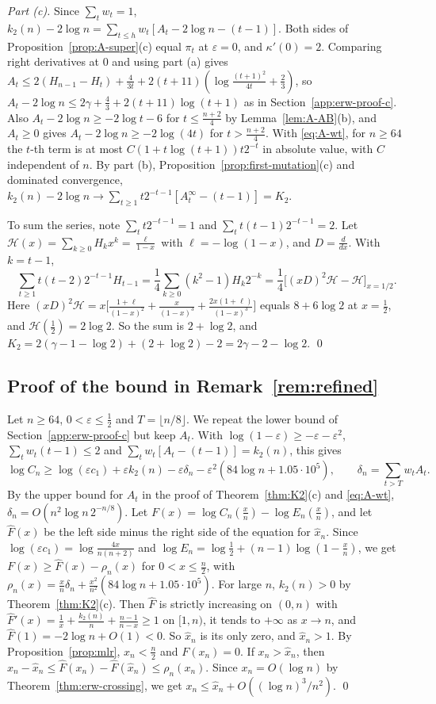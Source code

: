 \emph{Part (c).} Since $\sum_tw_t=1$,
$k_2(n)-2\log n=\sum_{t\le h}w_t[A_t-2\log n-(t-1)]$. Both sides of
Proposition~\ref{prop:A-super}(c) equal $\pi_t$ at $\varepsilon=0$, and
$\kappa'(0)=2$. Comparing right derivatives at 0 and using part (a) gives
$A_t\le2(H_{n-1}-H_t)+\frac4{3t}+2(t+11)(\log\frac{(t+1)^2}{4t}+\frac23)$,
so $A_t-2\log n\le2\gamma+\frac43+2(t+11)\log(t+1)$ as in
Section~\ref{app:erw-proof-c}. Also $A_t-2\log n\ge-2\log t-6$ for
$t\le\frac{n+2}4$ by Lemma~\ref{lem:A-AB}(b), and $A_t\ge0$ gives
$A_t-2\log n\ge-2\log(4t)$ for $t>\frac{n+2}4$. With \eqref{eq:A-wt}, for
$n\ge64$ the $t$-th term is at most $C(1+t\log(t+1))t2^{-t}$ in absolute
value, with $C$ independent of $n$. By part (b),
Proposition~\ref{prop:first-mutation}(c) and dominated convergence,
$k_2(n)-2\log n\to\sum_{t\ge1}t2^{-t-1}[A^\infty_t-(t-1)]=K_2$.

To sum the series, note $\sum_tt2^{-t-1}=1$ and $\sum_tt(t-1)2^{-t-1}=2$.
Let $\mathcal H(x)=\sum_{k\ge0}H_kx^k=\frac{\ell}{1-x}$ with
$\ell=-\log(1-x)$, and $D=\frac d{dx}$. With $k=t-1$,
\[
 \sum_{t\ge1}t(t-2)2^{-t-1}H_{t-1}=\frac14\sum_{k\ge0}(k^2-1)H_k2^{-k}
 =\frac14\bigl[(xD)^2\mathcal H-\mathcal H\bigr]_{x=1/2}.
\]
Here $(xD)^2\mathcal H=x\bigl[\frac{1+\ell}{(1-x)^2}+\frac{x}{(1-x)^3}
+\frac{2x(1+\ell)}{(1-x)^3}\bigr]$ equals $8+6\log2$ at $x=\frac12$, and
$\mathcal H(\frac12)=2\log2$. So the sum is $2+\log2$, and
$K_2=2(\gamma-1-\log2)+(2+\log2)-2=2\gamma-2-\log2$. \qed

\subsection{Proof of the bound in \texorpdfstring{Remark~\ref{rem:refined}}{Remark 2.10}}\label{app:erw-refined}

Let $n\ge64$, $0<\varepsilon\le\frac12$ and $T=\lfloor n/8\rfloor$. We
repeat the lower bound of Section~\ref{app:erw-proof-c} but keep $A_t$. With
$\log(1-\varepsilon)\ge-\varepsilon-\varepsilon^2$,
$\sum_tw_t(t-1)\le2$ and $\sum_tw_t[A_t-(t-1)]=k_2(n)$, this gives
\[
 \log C_n\ge\log(\varepsilon c_1)+\varepsilon k_2(n)-\varepsilon\delta_n
 -\varepsilon^2(84\log n+1.05\cdot10^5),\qquad
 \delta_n=\sum_{t>T}w_tA_t .
\]
By the upper bound for $A_t$ in the proof of Theorem~\ref{thm:K2}(c) and
\eqref{eq:A-wt}, $\delta_n=O(n^2\log n\,2^{-n/8})$. Let
$F(x)=\log C_n(\frac xn)-\log E_n(\frac xn)$, and let $\hat F(x)$ be the
left side minus the right side of the equation for $\hat x_n$. Since
$\log(\varepsilon c_1)=\log\frac{4x}{n(n+2)}$ and
$\log E_n=\log\frac12+(n-1)\log(1-\frac xn)$, we get
$F(x)\ge\hat F(x)-\rho_n(x)$ for $0<x\le\frac n2$, with
$\rho_n(x)=\frac xn\delta_n+\frac{x^2}{n^2}(84\log n+1.05\cdot10^5)$. For
large $n$, $k_2(n)>0$ by Theorem~\ref{thm:K2}(c). Then $\hat F$ is strictly
increasing on $(0,n)$ with $\hat F'(x)=\frac1x+\frac{k_2(n)}n+\frac{n-1}{n-x}
\ge1$ on $[1,n)$, it tends to $+\infty$ as $x\to n$, and
$\hat F(1)=-2\log n+O(1)<0$. So $\hat x_n$ is its only zero, and
$\hat x_n>1$. By Proposition~\ref{prop:mlr}, $x_n<\frac n2$ and $F(x_n)=0$.
If $x_n>\hat x_n$, then
$x_n-\hat x_n\le\hat F(x_n)-\hat F(\hat x_n)\le\rho_n(x_n)$. Since
$x_n=O(\log n)$ by Theorem~\ref{thm:erw-crossing}, we get
$x_n\le\hat x_n+O((\log n)^3/n^2)$. \qed
